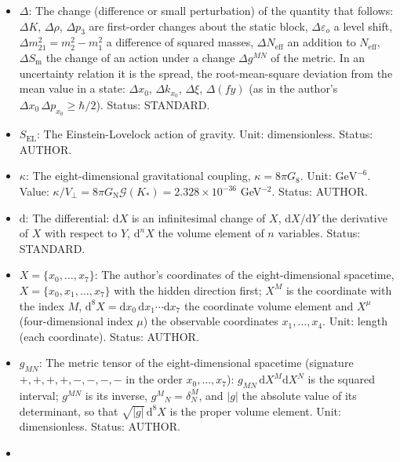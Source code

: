 \documentclass[
  10pt,
]{article}
\providecommand{\tightlist}{%
  \setlength{\itemsep}{0pt}\setlength{\parskip}{0pt}}
\begin{document}
\begin{itemize}
\tightlist
\item
  \(\Delta\): The change (difference or small perturbation) of the
  quantity that follows: \(\Delta K\), \(\Delta\rho\), \(\Delta p_3\)
  are first-order changes about the static block,
  \(\Delta\varepsilon_o\) a level shift,
  \(\Delta m^2_{21} = m_2^2 - m_1^2\) a difference of squared masses,
  \(\Delta N_{\mathrm{eff}}\) an addition to \(N_{\mathrm{eff}}\),
  \(\Delta S_{\mathrm{m}}\) the change of an action under a change
  \(\Delta g^{MN}\) of the metric. In an uncertainty relation it is the
  spread, the root-mean-square deviation from the mean value in a state:
  \(\Delta x_0\), \(\Delta k_{x_0}\), \(\Delta\xi\), \(\Delta(fy)\) (as
  in the author's \(\Delta x_0\,\Delta p_{x_0} \ge \hbar/2\)). Status:
  STANDARD.
\item
  \(S_{\mathrm{EL}}\): The Einstein-Lovelock action of gravity. Unit:
  dimensionless. Status: AUTHOR.
\item
  \(\kappa\): The eight-dimensional gravitational coupling,
  \(\kappa = 8\pi G_8\). Unit: \(\mathrm{GeV}^{-6}\). Value:
  \(\kappa/V_\perp = 8\pi G_{\mathrm{N}}\mathcal{G}(K_*) = 2.328\times10^{-36}\)
  GeV\(^{-2}\). Status: AUTHOR.
\item
  \(\mathrm{d}\): The differential: \(\mathrm{d}X\) is an infinitesimal
  change of \(X\), \(\mathrm{d}X/\mathrm{d}Y\) the derivative of \(X\)
  with respect to \(Y\), \(\mathrm{d}^nX\) the volume element of \(n\)
  variables. Status: STANDARD.
\item
  \(X = \{x_0, \dots, x_7\}\): The author's coordinates of the
  eight-dimensional spacetime, \(X = \{x_0, x_1, \dots, x_7\}\) with the
  hidden direction first; \(X^M\) is the coordinate with the index
  \(M\),
  \(\mathrm{d}^8X = \mathrm{d}x_0\,\mathrm{d}x_1\cdots\mathrm{d}x_7\)
  the coordinate volume element and \(X^\mu\) (four-dimensional index
  \(\mu\)) the observable coordinates \(x_1, \dots, x_4\). Unit: length
  (each coordinate). Status: AUTHOR.
\item
  \(g_{MN}\): The metric tensor of the eight-dimensional spacetime
  (signature \(+,+,+,+,-,-,-,-\) in the order \(x_0, \dots, x_7\)):
  \(g_{MN}\,\mathrm{d}X^M\mathrm{d}X^N\) is the squared interval;
  \(g^{MN}\) is its inverse, \(g^M{}_N = \delta^M_N\), and
  \(\lvert g\rvert\) the absolute value of its determinant, so that
  \(\sqrt{\lvert g\rvert}\,\mathrm{d}^8X\) is the proper volume element.
  Unit: dimensionless. Status: AUTHOR.
\item

\end{itemize}
\end{document}
